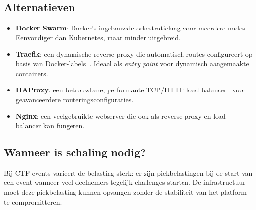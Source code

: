 \subsection{Alternatieven}

\begin{itemize}
  \item \textbf{Docker Swarm}: Docker's ingebouwde orkestratielaag voor meerdere nodes~\autocite{DockerSwarm}. Eenvoudiger dan Kubernetes, maar minder uitgebreid.
  \item \textbf{Traefik}: een dynamische reverse proxy die automatisch routes configureert op basis van Docker-labels~\autocite{Traefik}. Ideaal als \textit{entry point} voor dynamisch aangemaakte containers.
  \item \textbf{HAProxy}: een betrouwbare, performante TCP/HTTP load balancer~\autocite{HAProxy} voor geavanceerdere routeringsconfiguraties.
  \item \textbf{Nginx}: een veelgebruikte webserver die ook als reverse proxy en load balancer kan fungeren.
\end{itemize}

\subsection{Wanneer is schaling nodig?}

Bij CTF-events varieert de belasting sterk: er zijn piekbelastingen bij de start van een event wanneer veel deelnemers tegelijk challenges starten. De infrastructuur moet deze piekbelasting kunnen opvangen zonder de stabiliteit van het platform te compromitteren.
